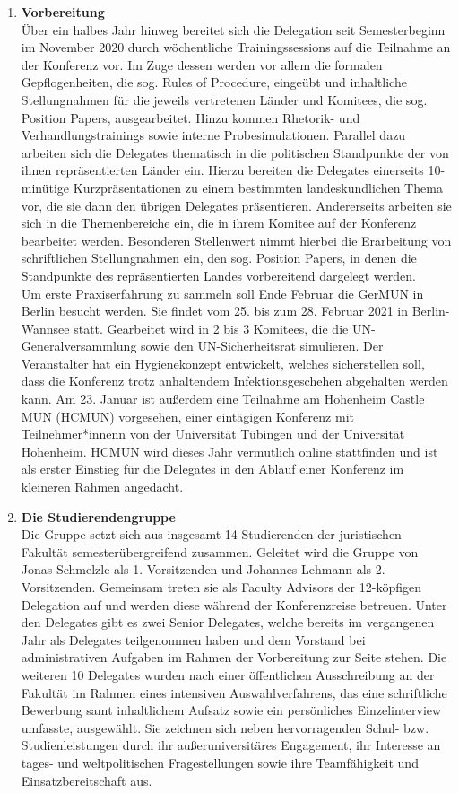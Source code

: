 {\begin{enumerate}
        \item \textbf{Vorbereitung}\\Über ein halbes Jahr hinweg bereitet sich die Delegation seit Semesterbeginn im November 2020 durch wöchentliche Trainingssessions auf die Teilnahme an der Konferenz vor. Im Zuge dessen werden vor allem die formalen Gepflogenheiten, die sog. Rules of Procedure, eingeübt und inhaltliche Stellungnahmen für die jeweils vertretenen Länder und Komitees, die sog. Position Papers, ausgearbeitet. Hinzu kommen Rhetorik- und Verhandlungstrainings sowie interne Probesimulationen. Parallel dazu arbeiten sich die Delegates thematisch in die politischen Standpunkte der von ihnen repräsentierten Länder ein. Hierzu bereiten die Delegates einerseits 10-minütige Kurzpräsentationen zu einem bestimmten landeskundlichen Thema vor, die sie dann den übrigen Delegates präsentieren. Andererseits arbeiten sie sich in die Themenbereiche ein, die in ihrem Komitee auf der Konferenz bearbeitet werden. Besonderen Stellenwert nimmt hierbei die Erarbeitung von schriftlichen Stellungnahmen ein, den sog. Position Papers, in denen die Standpunkte des repräsentierten Landes vorbereitend dargelegt werden.\\Um erste Praxiserfahrung zu sammeln soll Ende Februar die GerMUN in Berlin besucht werden. Sie findet vom 25. bis zum 28. Februar 2021 in Berlin-Wannsee statt. Gearbeitet wird in 2 bis 3 Komitees, die die UN-Generalversammlung sowie den UN-Sicherheitsrat simulieren. Der Veranstalter hat ein Hygienekonzept entwickelt, welches sicherstellen soll, dass die Konferenz trotz anhaltendem Infektionsgeschehen abgehalten werden kann. Am 23. Januar ist außerdem eine Teilnahme am Hohenheim Castle MUN (HCMUN) vorgesehen, einer eintägigen Konferenz mit Teilnehmer*innenn von der Universität Tübingen und der Universität Hohenheim. HCMUN wird dieses Jahr vermutlich online stattfinden und ist als erster Einstieg für die Delegates in den Ablauf einer Konferenz im kleineren Rahmen angedacht.\\
        \item \textbf{Die Studierendengruppe}\\Die Gruppe setzt sich aus insgesamt 14 Studierenden der juristischen Fakultät semesterübergreifend zusammen. Geleitet wird die Gruppe von Jonas Schmelzle als 1. Vorsitzenden und Johannes Lehmann als 2. Vorsitzenden. Gemeinsam treten sie als Faculty Advisors der 12-köpfigen Delegation auf und werden diese während der Konferenzreise betreuen. Unter den Delegates gibt es zwei Senior Delegates, welche bereits im vergangenen Jahr als Delegates teilgenommen haben und dem Vorstand bei administrativen Aufgaben im Rahmen der Vorbereitung zur Seite stehen. Die weiteren 10 Delegates wurden nach einer öffentlichen Ausschreibung an der Fakultät im Rahmen eines intensiven Auswahlverfahrens, das eine schriftliche Bewerbung samt inhaltlichem Aufsatz sowie ein persönliches Einzelinterview umfasste, ausgewählt. Sie zeichnen sich neben hervorragenden Schul- bzw. Studienleistungen durch ihr außeruniversitäres Engagement, ihr Interesse an tages- und weltpolitischen Fragestellungen sowie ihre Teamfähigkeit und Einsatzbereitschaft aus.\\

\end{enumerate}}
